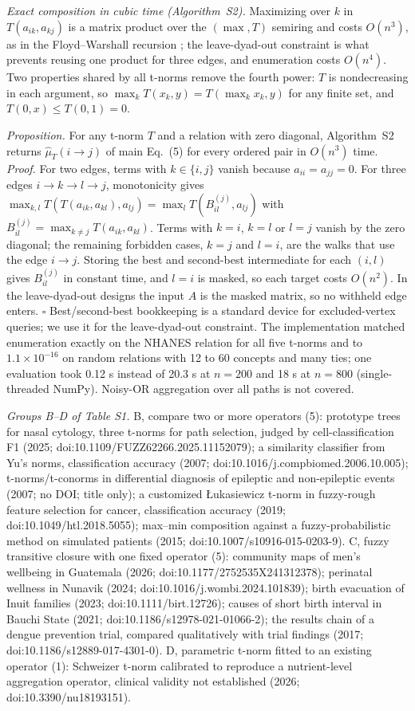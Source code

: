 \documentclass[journal]{IEEEtran}
\begin{document}
\emph{Exact composition in cubic time (Algorithm~S2).} Maximizing over $k$ in $T(a_{ik},a_{kj})$ is a matrix product over the $(\max,T)$ semiring and costs $O(n^3)$, as in the Floyd--Warshall recursion \cite{floyd1962}; the leave-dyad-out constraint is what prevents reusing one product for three edges, and enumeration costs $O(n^4)$. Two properties shared by all t-norms remove the fourth power: $T$ is nondecreasing in each argument, so $\max_kT(x_k,y)=T(\max_kx_k,y)$ for any finite set, and $T(0,x)\le T(0,1)=0$.

\emph{Proposition.} For any t-norm $T$ and a relation with zero diagonal, Algorithm~S2 returns $\hat\mu_T(i\to j)$ of main Eq.~(5) for every ordered pair in $O(n^3)$ time. \emph{Proof.} For two edges, terms with $k\in\{i,j\}$ vanish because $a_{ii}=a_{jj}=0$. For three edges $i\to k\to l\to j$, monotonicity gives $\max_{k,l}T(T(a_{ik},a_{kl}),a_{lj})=\max_lT(B^{(j)}_{il},a_{lj})$ with $B^{(j)}_{il}=\max_{k\ne j}T(a_{ik},a_{kl})$. Terms with $k=i$, $k=l$ or $l=j$ vanish by the zero diagonal; the remaining forbidden cases, $k=j$ and $l=i$, are the walks that use the edge $i\to j$. Storing the best and second-best intermediate for each $(i,l)$ gives $B^{(j)}_{il}$ in constant time, and $l=i$ is masked, so each target costs $O(n^2)$. In the leave-dyad-out designs the input $A$ is the masked matrix, so no withheld edge enters. $\square$ Best/second-best bookkeeping is a standard device for excluded-vertex queries; we use it for the leave-dyad-out constraint. The implementation matched enumeration exactly on the NHANES relation for all five t-norms and to $1.1\times10^{-16}$ on random relations with 12 to 60 concepts and many ties; one evaluation took 0.12 s instead of 20.3 s at $n=200$ and 18 s at $n=800$ (single-threaded NumPy). Noisy-OR aggregation over all paths is not covered.

\emph{Groups B--D of Table S1.} B, compare two or more operators (5): prototype trees for nasal cytology, three t-norms for path selection, judged by cell-classification F1 (2025; doi:10.1109/FUZZ62266.2025.11152079); a similarity classifier from Yu's norms, classification accuracy (2007; doi:10.1016/j.compbiomed.2006.10.005); t-norms/t-conorms in differential diagnosis of epileptic and non-epileptic events (2007; no DOI; title only); a customized {\L}ukasiewicz t-norm in fuzzy-rough feature selection for cancer, classification accuracy (2019; doi:10.1049/htl.2018.5055); max--min composition against a fuzzy-probabilistic method on simulated patients (2015; doi:10.1007/s10916-015-0203-9). C, fuzzy transitive closure with one fixed operator (5): community maps of men's wellbeing in Guatemala (2026; doi:10.1177/2752535X241312378); perinatal wellness in Nunavik (2024; doi:10.1016/j.wombi.2024.101839); birth evacuation of Inuit families (2023; doi:10.1111/birt.12726); causes of short birth interval in Bauchi State (2021; doi:10.1186/s12978-021-01066-2); the results chain of a dengue prevention trial, compared qualitatively with trial findings (2017; doi:10.1186/s12889-017-4301-0). D, parametric t-norm fitted to an existing operator (1): Schweizer t-norm calibrated to reproduce a nutrient-level aggregation operator, clinical validity not established (2026; doi:10.3390/nu18193151).
\end{document}
